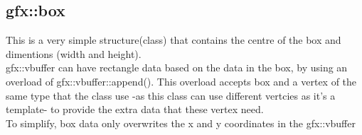 \subsection{gfx::box}
This is a very simple structure(class) that contains the centre of the box and dimentions (width and height).\\
gfx::vbuffer can have rectangle data based on the data in the box, by using an overload of
gfx::vbuffer::append(). This overload accepts box and a vertex of the same type that the class use -as this class can use different vertcies as it's a template- to provide the extra data that these vertex need. \\
To simplify, box data only overwrites the x and y coordinates in the gfx::vbuffer
